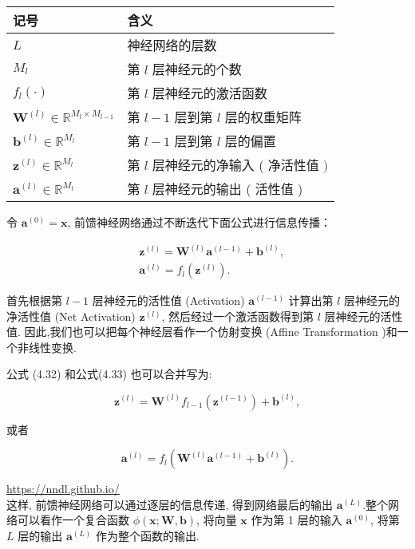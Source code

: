 \documentclass[10pt]{article}
\begin{document}
\begin{center}
\begin{tabular}{ll}
\hline
记号 & 含义 \\
\hline
$L$ & 神经网络的层数 \\
$M_{l}$ & 第 $l$ 层神经元的个数 \\
$f_{l}(\cdot)$ & 第 $l$ 层神经元的激活函数 \\
$\boldsymbol{W}^{(l)} \in \mathbb{R}^{M_{l} \times M_{l-1}}$ & 第 $l-1$ 层到第 $l$ 层的权重矩阵 \\
$\boldsymbol{b}^{(l)} \in \mathbb{R}^{M_{l}}$ & 第 $l-1$ 层到第 $l$ 层的偏置 \\
$\boldsymbol{z}^{(l)} \in \mathbb{R}^{M_{l}}$ & 第 $l$ 层神经元的净输入 ( 净活性值 $)$ \\
$\boldsymbol{a}^{(l)} \in \mathbb{R}^{M_{l}}$ & 第 $l$ 层神经元的输出 ( 活性值 ) \\
\hline
\end{tabular}
\end{center}

令 $\boldsymbol{a}^{(0)}=\boldsymbol{x}$, 前馈神经网络通过不断迭代下面公式进行信息传播：


\begin{align*}
& \boldsymbol{z}^{(l)}=\boldsymbol{W}^{(l)} \boldsymbol{a}^{(l-1)}+\boldsymbol{b}^{(l)},  \tag{4.32}\\
& \boldsymbol{a}^{(l)}=f_{l}\left(\boldsymbol{z}^{(l)}\right) . \tag{4.33}
\end{align*}


首先根据第 $l-1$ 层神经元的活性值 (Activation) $\boldsymbol{a}^{(l-1)}$ 计算出第 $l$ 层神经元的净活性值 (Net Activation) $\boldsymbol{z}^{(l)}$, 然后经过一个激活函数得到第 $l$ 层神经元的活性值. 因此,我们也可以把每个神经层看作一个仿射变换 (Affine Transformation )和一个非线性变换.

公式 (4.32) 和公式(4.33) 也可以合并写为:


\begin{equation*}
\boldsymbol{z}^{(l)}=\boldsymbol{W}^{(l)} f_{l-1}\left(\boldsymbol{z}^{(l-1)}\right)+\boldsymbol{b}^{(l)}, \tag{4.34}
\end{equation*}


或者


\begin{equation*}
\boldsymbol{a}^{(l)}=f_{l}\left(\boldsymbol{W}^{(l)} \boldsymbol{a}^{(l-1)}+\boldsymbol{b}^{(l)}\right) . \tag{4.35}
\end{equation*}


\href{https://nndl.github.io/}{https://nndl.github.io/}\\
这样, 前馈神经网络可以通过逐层的信息传递, 得到网络最后的输出 $\boldsymbol{a}^{(L)}$.整个网络可以看作一个复合函数 $\phi(\boldsymbol{x} ; \boldsymbol{W}, \boldsymbol{b})$, 将向量 $\boldsymbol{x}$ 作为第 1 层的输入 $\boldsymbol{a}^{(0)}$, 将第 $L$ 层的输出 $\boldsymbol{a}^{(L)}$ 作为整个函数的输出.
\end{document}
